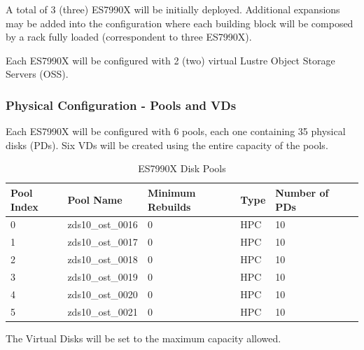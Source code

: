 \documentclass{article}
\begin{document}
A total of 3 (three) ES7990X will be initially deployed. Additional expansions may be added into the configuration where each building block will be composed by a rack fully loaded (correspondent to three ES7990X). 

Each ES7990X will be configured with 2 (two) virtual Lustre Object Storage Servers (OSS).

\subsubsection{Physical Configuration - Pools and VDs}
Each ES7990X will be configured with 6 pools, each one containing 35 physical disks (PDs). Six VDs will be created using the entire capacity of the pools. 

\begin{table}[htbp]
\centering
\begin{tabular}{|l|l|l|l|l|l|}
    \hline
    \textbf{Pool Index} & \textbf{Pool Name} & \textbf{Minimum Rebuilds} & \textbf{Type} & \textbf{Number of PDs}\\
    \hline
    0 & zds10\_ost\_0016 & 0 & HPC & 10 \\
    1 & zds10\_ost\_0017 & 0 & HPC & 10 \\
    2 & zds10\_ost\_0018 & 0 & HPC & 10 \\
    3 & zds10\_ost\_0019 & 0 & HPC & 10 \\
    4 & zds10\_ost\_0020 & 0 & HPC & 10 \\
    5 & zds10\_ost\_0021 & 0 & HPC & 10 \\
    \hline
\end{tabular}
\caption{ES7990X Disk Pools}
\label{tab:es7990x-pools-table}
\end{table}

\begin{table}[htbp]
\caption{ES7990X Virtual Disks}
\label{tab:es7990x-vds-table}
\end{table}
The Virtual Disks will be set to the maximum capacity allowed.
\end{document}
